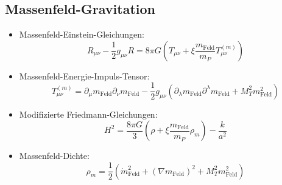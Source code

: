 \documentclass[12pt,a4paper]{article}
\begin{document}
\subsection{Massenfeld-Gravitation}
\begin{itemize}
	\item Massenfeld-Einstein-Gleichungen:
	\begin{equation}
		R_{\mu\nu} - \frac{1}{2}g_{\mu\nu}R = 8\pi G \left(T_{\mu\nu} + \xi \frac{m_{\text{Feld}}}{m_P} T_{\mu\nu}^{(m)}\right)
	\end{equation}
	
	\item Massenfeld-Energie-Impuls-Tensor:
	\begin{equation}
		T_{\mu\nu}^{(m)} = \partial_\mu m_{\text{Feld}} \partial_\nu m_{\text{Feld}} - \frac{1}{2}g_{\mu\nu} \left(\partial_\lambda m_{\text{Feld}} \partial^\lambda m_{\text{Feld}} + M_T^2 m_{\text{Feld}}^2\right)
	\end{equation}
	
	\item Modifizierte Friedmann-Gleichungen:
	\begin{equation}
		H^2 = \frac{8\pi G}{3}\left(\rho + \xi \frac{m_{\text{Feld}}}{m_P} \rho_m\right) - \frac{k}{a^2}
	\end{equation}
	
	\item Massenfeld-Dichte:
	\begin{equation}
		\rho_m = \frac{1}{2}\left(\dot{m}_{\text{Feld}}^2 + (\nabla m_{\text{Feld}})^2 + M_T^2 m_{\text{Feld}}^2\right)
	\end{equation}
\end{itemize}
\end{document}

